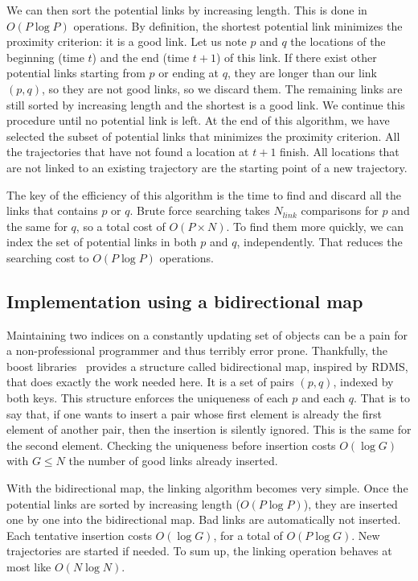 We can then sort the potential links by increasing length. This is done in $O(P\log P)$ operations. By definition, the shortest potential link minimizes the proximity criterion: it is a good link. Let us note $p$ and $q$ the locations of the beginning (time $t$) and the end (time $t+1$) of this link. If there exist other potential links starting from $p$ or ending at $q$, they are longer than our link $(p, q)$, so they are not good links, so we discard them. The remaining links are still sorted by increasing length and the shortest is a good link. We continue this procedure until no potential link is left. At the end of this algorithm, we have selected the subset of potential links that minimizes the proximity criterion. All the trajectories that have not found a location at $t+1$ finish. All locations that are not linked to an existing trajectory are the starting point of a new trajectory.

The key of the efficiency of this algorithm is the time to find and discard all the links that contains $p$ or $q$. Brute force searching takes $N_{link}$ comparisons for $p$ and the same for $q$, so a total cost of $O(P \times N)$. To find them more quickly, we can index the set of potential links in both $p$ and $q$, independently. That reduces the searching cost to $O(P\log P)$ operations.

\subsection{Implementation using a bidirectional map}

Maintaining two indices on a constantly updating set of objects can be a pain for a non-professional programmer and thus terribly error prone. Thankfully, the boost libraries~\citep{boost} provides a structure called bidirectional map, inspired by \ac{RDMS}, that does exactly the work needed here. It is a set of pairs $(p,q)$, indexed by both keys. This structure enforces the uniqueness of each $p$ and each $q$. That is to say that, if one wants to insert a pair whose first element is already the first element of another pair, then the insertion is silently ignored. This is the same for the second element. Checking the uniqueness before insertion costs $O(\log G)$ with $G \leq N$ the number of good links already inserted.

With the bidirectional map, the linking algorithm becomes very simple. Once the potential links are sorted by increasing length ($O(P \log P)$), they are inserted one by one into the bidirectional map. Bad links are automatically not inserted. Each tentative insertion costs $O(\log G)$, for a total of $O(P \log G)$. New trajectories are started if needed. To sum up, the linking operation behaves at most like $O(N\log N)$.

